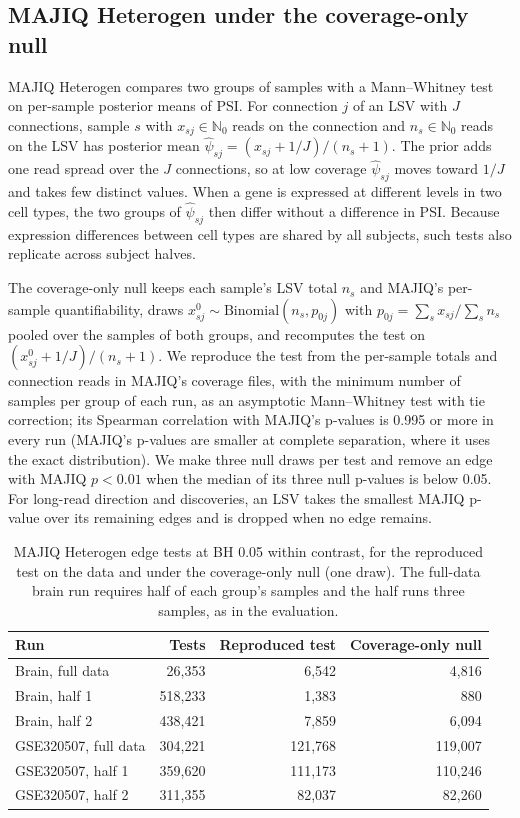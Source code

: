 \documentclass[11pt]{article}
\begin{document}
\subsection{MAJIQ Heterogen under the coverage-only null}
\label{sec:majiq-null}

MAJIQ Heterogen compares two groups of samples with a Mann--Whitney test on per-sample posterior means of PSI. For connection $j$ of an LSV with $J$ connections, sample $s$ with $x_{sj}\in\mathbb N_0$ reads on the connection and $n_s\in\mathbb N_0$ reads on the LSV has posterior mean $\hat\psi_{sj}=(x_{sj}+1/J)/(n_s+1)$. The prior adds one read spread over the $J$ connections, so at low coverage $\hat\psi_{sj}$ moves toward $1/J$ and takes few distinct values. When a gene is expressed at different levels in two cell types, the two groups of $\hat\psi_{sj}$ then differ without a difference in PSI. Because expression differences between cell types are shared by all subjects, such tests also replicate across subject halves.

The coverage-only null keeps each sample's LSV total $n_s$ and MAJIQ's per-sample quantifiability, draws $x^0_{sj}\sim\mathrm{Binomial}(n_s,p_{0j})$ with $p_{0j}=\sum_s x_{sj}/\sum_s n_s$ pooled over the samples of both groups, and recomputes the test on $(x^0_{sj}+1/J)/(n_s+1)$. We reproduce the test from the per-sample totals and connection reads in MAJIQ's coverage files, with the minimum number of samples per group of each run, as an asymptotic Mann--Whitney test with tie correction; its Spearman correlation with MAJIQ's p-values is 0.995 or more in every run (MAJIQ's p-values are smaller at complete separation, where it uses the exact distribution). We make three null draws per test and remove an edge with MAJIQ $p<0.01$ when the median of its three null p-values is below 0.05. For long-read direction and discoveries, an LSV takes the smallest MAJIQ p-value over its remaining edges and is dropped when no edge remains.

\begin{table}[ht]
\centering
\small
\begin{tabular}{lrrr}
\toprule
Run & Tests & Reproduced test & Coverage-only null\\
\midrule
Brain, full data & 26{,}353 & 6{,}542 & 4{,}816\\
Brain, half 1 & 518{,}233 & 1{,}383 & 880\\
Brain, half 2 & 438{,}421 & 7{,}859 & 6{,}094\\
GSE320507, full data & 304{,}221 & 121{,}768 & 119{,}007\\
GSE320507, half 1 & 359{,}620 & 111{,}173 & 110{,}246\\
GSE320507, half 2 & 311{,}355 & 82{,}037 & 82{,}260\\
\bottomrule
\end{tabular}
\caption{MAJIQ Heterogen edge tests at BH 0.05 within contrast, for the reproduced test on the data and under the coverage-only null (one draw). The full-data brain run requires half of each group's samples and the half runs three samples, as in the evaluation.}
\label{tab:majiq-null}
\end{table}
\end{document}
